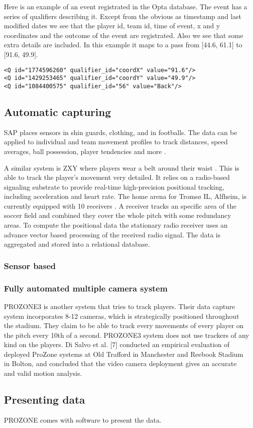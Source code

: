 Here is an example of an event registrated in the Opta database. The event has a series of qualifiers describing it. Except from the obvious as timestamp and last modified dates we see that the player id, team id, time of event, x and y coordinates and the outcome of the event are registrated. Also we see that some extra details are included. In this example it maps to a pass from [44.6, 61.1] to [91.6, 49.9].

\begin{lstlisting}
<Q id="1774596260" qualifier_id="coordX" value="91.6"/>
<Q id="1429253465" qualifier_id="coordY" value="49.9"/>
<Q id="1084400575" qualifier_id="56" value="Back"/>
\end{lstlisting}

\subsection{Automatic capturing}
SAP places sensors in shin guards, clothing, and in footballs. The data can be applied to individual and team movement profiles to track distances, speed averages, ball possession, player tendencies and more . 

A similar system is ZXY where players wear a belt around their waist \cite{PTW}. This is able to track the player’s movement very detailed. It relies on a radio-based signaling substrate to provide real-time high-precision positional tracking, including acceleration and heart rate. The home arena for Tromsø IL, Alfheim, is currently equipped with 10 receivers . A receiver tracks an specific area of the soccer field and combined they cover the whole pitch with some redundancy areas. To compute the positional data the stationary radio receiver uses an advance vector based processing of the received radio signal. The data is aggregated and stored into a relational database.

\subsubsection{Sensor based}



\subsubsection{Fully automated multiple camera system}
PROZONE3  is another system that tries to track players. Their data capture system incorporates 8-12 cameras, which is strategically positioned throughout the stadium. They claim to be able to track every movements of every player on the pitch every 10th of a second.  PROZONE3 system does not use trackers of any kind on the players. Di Salvo et al. [7] conducted an empirical evaluation of deployed ProZone systems at Old Trafford in Manchester and Reebook Stadium in Bolton, and concluded that the video camera deployment gives an accurate and valid motion analysis.


\subsection{Presenting data}

PROZONE comes  with software to present the data. 